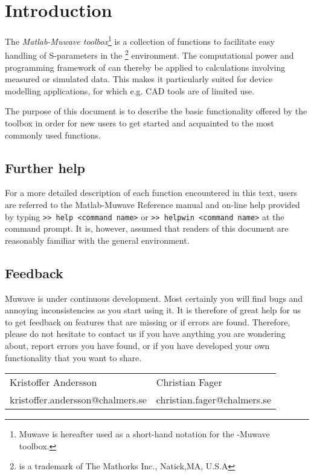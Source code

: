 %
\section{Introduction}%
The \emph{Matlab-Muwave toolbox}\footnote{Muwave is hereafter used
as a short-hand notation for the \matlab-Muwave toolbox.} is a
collection of functions to facilitate easy handling of
S-parameters in the \matlab\footnote{\matlab is a trademark of The
Mathorks Inc., Natick,MA, U.S.A} environment. The computational
power and programming framework of \matlab can thereby be applied
to calculations involving measured or simulated data. This makes
it particularly suited for device modelling applications, for
which e.g. CAD tools are of limited use.

The purpose of this document is to describe the basic
functionality offered by the toolbox in order for new users to get
started and acquainted to the most commonly used functions.

\subsection{Further help}
For a more detailed description of each function encountered in
this text, users are referred to the Matlab-Muwave Reference manual
and on-line help provided by typing \verb">> help <command name>"
or \verb">> helpwin <command name>" at the \matlab command prompt.
It is, however, assumed that readers of this document are
reasonably familiar with the general \matlab environment.

\subsection{Feedback}
Muwave is under continuous development. Most certainly you will
find bugs and annoying inconsistencies as you start using it. It
is therefore of great help for us to get feedback on features that
are missing or if errors are found. Therefore, please do not
hesitate to contact us if you have anything you are wondering
about, report errors you have found, or if you have developed your
own functionality that you want to share.

\vspace{5mm} \setlength{\tabcolsep}{0.5cm} \noindent
\begin{center}
    \begin{tabular}{ll}
    Kristoffer Andersson & Christian Fager\\
    kristoffer.andersson@chalmers.se &
    christian.fager@chalmers.se\\
\end{tabular}
\end{center}

